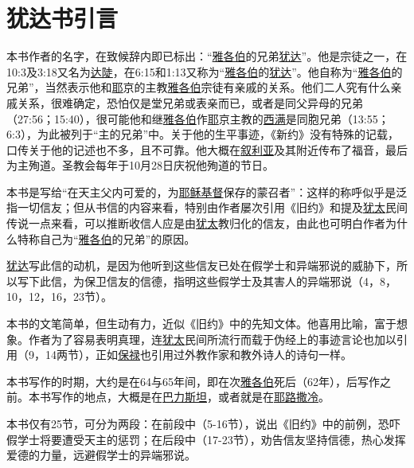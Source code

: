 \chapter*{犹达书引言}


本书作者的名字，在致候辞内即已标出：“\uline{雅各伯}的兄弟\uline{犹达}”。他是宗徒之一，在10:3及3:18又名为\uline{达陡}，在6:15和1:13又称为“\uline{雅各伯}的\uline{犹达}”。他自称为“\uline{雅各伯}的兄弟”，当然表示他和\uline{耶}京的主教\uline{雅各伯}宗徒有亲戚的关系。他们二人究有什么亲戚关系，很难确定，恐怕仅是堂兄弟或表亲而已，或者是同父异母的兄弟（27:56；15:40），很可能他和继\uline{雅各伯}作\uline{耶}京主教的\uline{西满}是同胞兄弟（13:55；6:3），为此被列于“主的兄弟”中。关于他的生平事迹，《新约》没有特殊的记载，口传关于他的记述也不多，且不可靠。他大概在\uline{叙利亚}及其附近传布了福音，最后为主殉道。圣教会每年于10月28日庆祝他殉道的节日。

本书是写给“在天主父内可爱的，为\uline{耶稣}\uline{基督}保存的蒙召者”：这样的称呼似乎是泛指一切信友；但从书信的内容来看，特别由作者屡次引用《旧约》和提及\uline{犹太}民间传说一点来看，可以推断收信人应是由\uline{犹太}教归化的信友，由此也可明白作者为什么特称自己为“\uline{雅各伯}的兄弟”的原因。

\uline{犹达}写此信的动机，是因为他听到这些信友已处在假学士和异端邪说的威胁下，所以写下此信，为保卫信友的信德，指明这些假学士及其害人的异端邪说（4，8，10，12，16，23节）。

本书的文笔简单，但生动有力，近似《旧约》中的先知文体。他喜用比喻，富于想象。作者为了容易表明真理，连\uline{犹太}民间所流行而载于伪经上的事迹言论也加以引用（9，14两节），正如\uline{保禄}也引用过外教作家和教外诗人的诗句一样。

本书写作的时期，大约是在64与65年间，即在次\uline{雅各伯}死后（62年），后写作之前。本书写作的地点，大概是在\uline{巴力斯坦}，或者就是在\uline{耶路撒冷}。

本书仅有25节，可分为两段：在前段中（5-16节），说出《旧约》中的前例，恐吓假学士将要遭受天主的惩罚；在后段中（17-23节），劝告信友坚持信德，热心发挥爱德的力量，远避假学士的异端邪说。